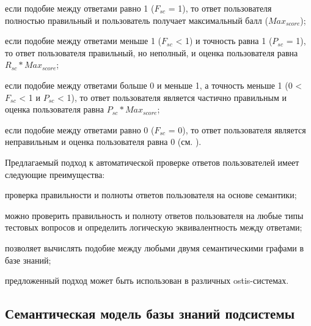 \begin{textitemize}
	\item если подобие между ответами равно 1 ($F_{sc}$ = 1), то ответ пользователя полностью правильный и пользователь получает максимальный балл ($Max_{score}$);
	
	\item если подобие между ответами меньше 1 ($F_{sc}$ < 1) и точность равна 1 ($P_{sc}$ = 1), то ответ пользователя правильный, но неполный, и оценка пользователя равна $R_{sc}*Max_{score}$;
	
	\item если подобие между ответами больше 0 и меньше 1, а точность меньше 1 (0 < $F_{sc}$ < 1 и $P_{sc}$ < 1), то ответ пользователя является частично правильным и оценка пользователя равна $P_{sc}*Max_{score}$;
	
	\item если подобие между ответами равно 0 ($F_{sc}$ = 0), то ответ пользователя является неправильным и оценка пользователя равна 0 (см. ).
\end{textitemize}

Предлагаемый подход к автоматической проверке ответов пользователей имеет следующие преимущества:

\begin{textitemize}
	\item проверка правильности и полноты ответов пользователя на основе семантики;
	
	\item можно проверить правильность и полноту ответов пользователя на любые типы тестовых вопросов и определить логическую эквивалентность между ответами;
	
	\item позволяет вычислять подобие между любыми двумя семантическими графами в базе знаний;
	
	\item предложенный подход может быть использован в различных ostis-системах.
\end{textitemize}

\subsection{Семантическая модель базы знаний подсистемы}

